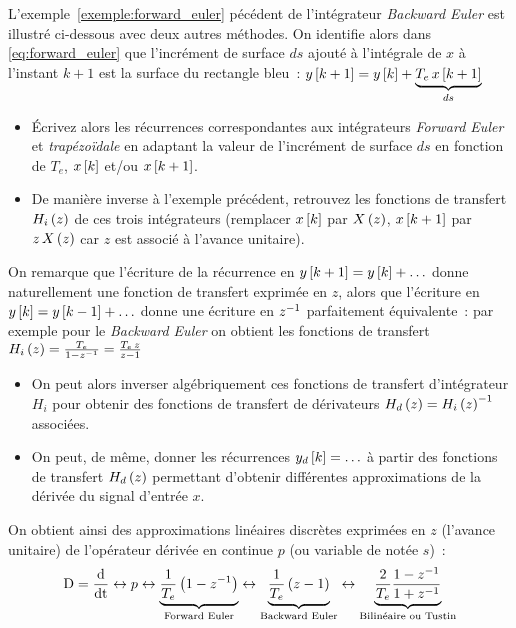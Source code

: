 \begin{exercice}

  L'exemple~\ref{exemple:forward_euler} pécédent de l'intégrateur
  \emph{Backward Euler} est illustré ci-dessous avec deux autres
  méthodes. On identifie alors dans \eqref{eq:forward_euler} que
  l'incrément de surface $ds$ ajouté à l'intégrale de $x$ à l'instant
  $k+1$ est la surface du rectangle bleu~:
  $y\left[k+1\right] = y\left[k\right] + \underbrace{T_e\,x\left[k+1\right]}_{ds}$


  \begin{itemize}
  \item Écrivez alors les récurrences correspondantes aux intégrateurs
    \emph{Forward Euler} et \emph{trapézoïdale} en adaptant la valeur
    de l'incrément de surface $ds$ en fonction de $T_e$, $x\left[k\right]$
    et/ou $x\left[k+1\right]$.
  \item De manière inverse à l'exemple précédent, retrouvez les
    fonctions de transfert $H_i\left(z\right)$ de ces trois intégrateurs
    (remplacer $x\left[k\right]$  par $X\left(z\right)$, $x\left[k+1\right]$ par $z\,X\left(z\right)$ car
    $z$ est associé à l'avance unitaire).
  \end{itemize}
  On remarque que l'écriture de la récurrence en
  $y\left[k+1\right]=y\left[k\right]+\ldots$ donne naturellement une fonction de
  transfert exprimée en $z$, alors que l'écriture en
  $y\left[k\right]=y\left[k-1\right]+\ldots$ donne une écriture en $z^{-1}$ parfaitement
  équivalente~: par exemple pour le \emph{Backward Euler} on obtient
  les fonctions de transfert
  $H_i\left(z\right)=\frac{T_e}{1-z^{-1}}=\frac{T_e\,z}{z-1}$

  \begin{itemize}
  \item On peut alors inverser algébriquement ces fonctions de
    transfert d'intégrateur $H_i$ pour obtenir des fonctions de
    transfert de dérivateurs $H_d\left(z\right)=H_i\left(z\right)^{-1}$ associées.
  \item On peut, de même, donner les récurrences $y_d\left[k\right]=\ldots$ à
    partir des fonctions de transfert $H_d\left(z\right)$ permettant d'obtenir
    différentes approximations de la dérivée du signal d'entrée $x$.
  \end{itemize}

  On obtient ainsi des approximations linéaires discrètes exprimées en
  $z$ (l'avance unitaire) de l'opérateur dérivée en continue $p$ (ou
  variable de \Laplace{} notée $s$)~:
  \begin{equation}
    \label{eq:approx_de_p}
    \mathrm{D}=\frac{\mathrm{d{}}}{\mathrm{d{t}}} \leftrightarrow p \leftrightarrow \underbrace{\frac{1}{T_e}\left(1-z^{-1}\right)}_{\text{Forward Euler}}\leftrightarrow \underbrace{\frac{1}{T_e}\left(z-1\right)}_{\text{Backward Euler}} \leftrightarrow \underbrace{\frac{2}{T_e}\frac{1-z^{-1}}{1+z^{-1}}}_{\text{Bilinéaire ou Tustin}} 
  \end{equation}  
\end{exercice}
